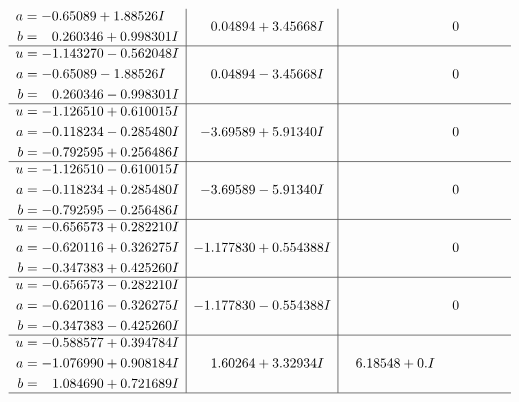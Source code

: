 \documentclass[1p]{elsarticle_modified}
\theoremstyle{definition}
\begin{document}
$$\begin{array}{c|c|c}
\begin{aligned}
a &= -0.65089 + 1.88526 I \\
b &= \phantom{-}0.260346 + 0.998301 I\end{aligned}
 & \phantom{-}0.04894 + 3.45668 I & \phantom{-0.000000 } 0 \\ \hline\begin{aligned}
u &= -1.143270 - 0.562048 I \\
a &= -0.65089 - 1.88526 I \\
b &= \phantom{-}0.260346 - 0.998301 I\end{aligned}
 & \phantom{-}0.04894 - 3.45668 I & \phantom{-0.000000 } 0 \\ \hline\begin{aligned}
u &= -1.126510 + 0.610015 I \\
a &= -0.118234 - 0.285480 I \\
b &= -0.792595 + 0.256486 I\end{aligned}
 & -3.69589 + 5.91340 I & \phantom{-0.000000 } 0 \\ \hline\begin{aligned}
u &= -1.126510 - 0.610015 I \\
a &= -0.118234 + 0.285480 I \\
b &= -0.792595 - 0.256486 I\end{aligned}
 & -3.69589 - 5.91340 I & \phantom{-0.000000 } 0 \\ \hline\begin{aligned}
u &= -0.656573 + 0.282210 I \\
a &= -0.620116 + 0.326275 I \\
b &= -0.347383 + 0.425260 I\end{aligned}
 & -1.177830 + 0.554388 I & \phantom{-0.000000 } 0 \\ \hline\begin{aligned}
u &= -0.656573 - 0.282210 I \\
a &= -0.620116 - 0.326275 I \\
b &= -0.347383 - 0.425260 I\end{aligned}
 & -1.177830 - 0.554388 I & \phantom{-0.000000 } 0 \\ \hline\begin{aligned}
u &= -0.588577 + 0.394784 I \\
a &= -1.076990 + 0.908184 I \\
b &= \phantom{-}1.084690 + 0.721689 I\end{aligned}
 & \phantom{-}1.60264 + 3.32934 I & \phantom{-}6.18548 + 0. I\phantom{ +0.000000I}\\
 \hline 
 \end{array}$$\newpage$$\begin{array}{c|c|c}  

\end{array}$$
\end{document}
